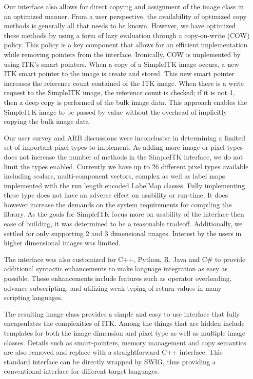 \documentclass{frontiersMED} %
\begin{document}
Our interface also allows for direct copying and assignment of the
image class in an optimized manner. From a user perspective, the
availability of optimized copy methods is generally all that needs to
be known. However, we have optimized these methods by using a form of
lazy evaluation through a copy-on-write (COW)  policy. This policy is
a key component that allows for an efficient implementation while
removing pointers from the interface. Ironically, COW is implemented
by using ITK’s smart pointers. When a copy of a SimpleITK image
occurs, a new ITK smart pointer to the image is create and
stored. This new smart pointer increases the reference count contained
of the ITK image. When there is a write request to the SimpleITK
image, the reference count is checked; if it is not 1, then a deep
copy is performed of the bulk image data. This approach enables the
SimpleITK image to be passed by value without the overhead of
implicitly copying the bulk image data.

Our user survey and ARB discussions were inconclusive in determining a
limited set of important pixel types to implement. As adding more
image or pixel types does not increase the number of methods in the
SimpleITK interface, we do not limit the types enabled. Currently we
have up to 26 different pixel types available including scalars,
multi-component vectors, complex as well as label maps implemented
with the run length encoded LabelMap classes. Fully implementing these
type does not have an adverse effect on usability or run-time. It does
however increase the demands on the system requirements for compiling
the library. As the goals for SimpleITK focus more on usability of the
interface then ease of building, it was determined to be a reasonable
tradeoff. Additionally, we settled for only supporting 2 and 3
dimensional images. Interest by the users in higher dimensional images
was limited.

The interface was also customized for C++, Python, R, Java and C\# to
provide additional syntactic enhancements to make language integration
as easy as possible. These enhancements include features such as
operator overloading, advance subscripting, and utilizing weak typing
of return values in many scripting languages.

The resulting image class provides a simple and easy to use interface
that fully encapsulates the complexities of ITK. Among the things that
are hidden include templates for both the image dimension and pixel
type as well as multiple image classes. Details such as
smart-pointers, memory management and copy semantics are also removed
and replace with a straightforward C++ interface. This standard
interface can be directly wrapped by SWIG, thus providing a
conventional interface for different target languages.
\end{document}
